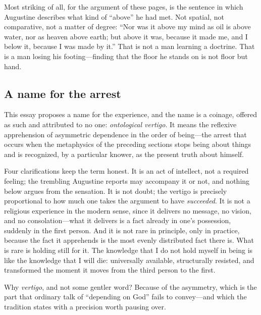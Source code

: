 Most striking of all, for the argument of these pages, is the sentence in which Augustine describes what kind of ``above'' he had met. Not spatial, not comparative, not a matter of degree: ``Nor was it above my mind as oil is above water, nor as heaven above earth; but above it was, because it made me, and I below it, because I was made by it.'' That is not a man learning a doctrine. That is a man losing his footing---finding that the floor he stands on is not floor but hand.

\subsection{A name for the arrest}

This essay proposes a name for the experience, and the name is a coinage, offered as such and attributed to no one: \emph{ontological vertigo}. It means the reflexive apprehension of asymmetric dependence in the order of being---the arrest that occurs when the metaphysics of the preceding sections stops being about things and is recognized, by a particular knower, as the present truth about himself.

Four clarifications keep the term honest. It is an act of intellect, not a required feeling; the trembling Augustine reports may accompany it or not, and nothing below argues from the sensation. It is not doubt; the vertigo is precisely proportional to how much one takes the argument to have \emph{succeeded}. It is not a religious experience in the modern sense, since it delivers no message, no vision, and no consolation---what it delivers is a fact already in one's possession, suddenly in the first person. And it is not rare in principle, only in practice, because the fact it apprehends is the most evenly distributed fact there is. What is rare is holding still for it. The knowledge that I do not hold myself in being is like the knowledge that I will die: universally available, structurally resisted, and transformed the moment it moves from the third person to the first.

Why \emph{vertigo}, and not some gentler word? Because of the asymmetry, which is the part that ordinary talk of ``depending on God'' fails to convey---and which the tradition states with a precision worth pausing over.

